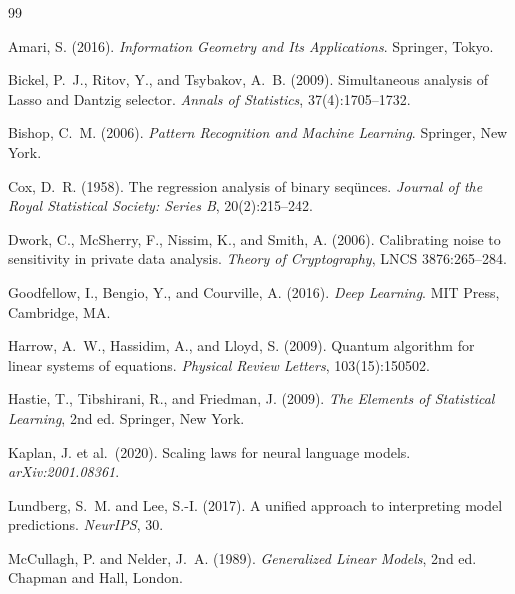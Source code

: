 ﻿\documentclass[12pt, a4paper]{article}
\theoremstyle{definition}
\theoremstyle{remark}
\begin{document}

\begin{thebibliography}{99}

Amari, S. (2016).
\newblock \textit{Information Geometry and Its Applications}.
\newblock Springer, Tokyo.

Bickel, P.~J., Ritov, Y., and Tsybakov, A.~B. (2009).
\newblock Simultaneous analysis of Lasso and Dantzig selector.
\newblock \textit{Annals of Statistics}, 37(4):1705--1732.

Bishop, C.~M. (2006).
\newblock \textit{Pattern Recognition and Machine Learning}.
\newblock Springer, New York.

Cox, D.~R. (1958).
\newblock The regression analysis of binary seqünces.
\newblock \textit{Journal of the Royal Statistical Society: Series B}, 20(2):215--242.

Dwork, C., McSherry, F., Nissim, K., and Smith, A. (2006).
\newblock Calibrating noise to sensitivity in private data analysis.
\newblock \textit{Theory of Cryptography}, LNCS 3876:265--284.

Goodfellow, I., Bengio, Y., and Courville, A. (2016).
\newblock \textit{Deep Learning}.
\newblock MIT Press, Cambridge, MA.

Harrow, A.~W., Hassidim, A., and Lloyd, S. (2009).
\newblock Quantum algorithm for linear systems of equations.
\newblock \textit{Physical Review Letters}, 103(15):150502.

Hastie, T., Tibshirani, R., and Friedman, J. (2009).
\newblock \textit{The Elements of Statistical Learning}, 2nd ed.
\newblock Springer, New York.

Kaplan, J. et al.\ (2020).
\newblock Scaling laws for neural language models.
\newblock \textit{arXiv:2001.08361}.

Lundberg, S.~M. and Lee, S.-I. (2017).
\newblock A unified approach to interpreting model predictions.
\newblock \textit{NeurIPS}, 30.

McCullagh, P. and Nelder, J.~A. (1989).
\newblock \textit{Generalized Linear Models}, 2nd ed.
\newblock Chapman and Hall, London.


\end{thebibliography}
\end{document}
